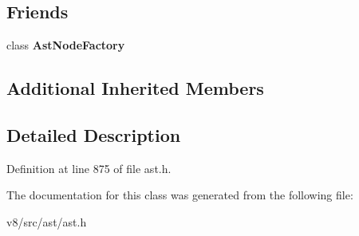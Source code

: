 \subsection*{Friends}
\begin{DoxyCompactItemize}
\item 
\mbox{\label{classv8_1_1internal_1_1SwitchStatement_a8d587c8ad3515ff6433eb83c578e795f}} 
class {\bfseries Ast\+Node\+Factory}
\end{DoxyCompactItemize}
\subsection*{Additional Inherited Members}


\subsection{Detailed Description}


Definition at line 875 of file ast.\+h.



The documentation for this class was generated from the following file\+:\begin{DoxyCompactItemize}
\item 
v8/src/ast/ast.\+h\end{DoxyCompactItemize}
